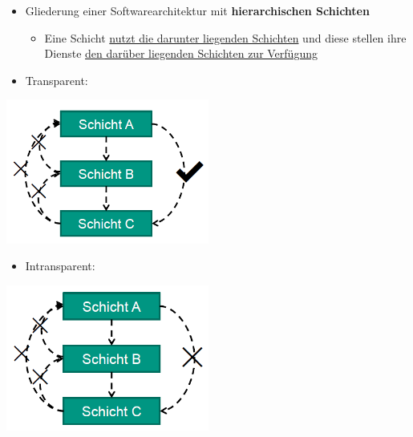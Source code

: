 			\begin{itemize}
				\item Gliederung einer Softwarearchitektur mit \textbf{hierarchischen Schichten}
				\begin{itemize}
					\item Eine Schicht \underline{nutzt die darunter liegenden Schichten}  und diese \newline stellen ihre Dienste \underline{den darüber liegenden Schichten zur Verfügung}
				\end{itemize}
				\item Transparent:
			\end{itemize}						
			\begin{center}
				\includegraphics[width=0.5\textwidth]{../resources/images/transparenteSchichtenarchitektur.png}
			\end{center}					
			\newpage
			\begin{itemize}	
				\item Intransparent:	
			\end{itemize}				
			\begin{center}
				\includegraphics[width=0.5\textwidth]{../resources/images/intransparenteSchichtenarchitektur.png}
			\end{center}
			
